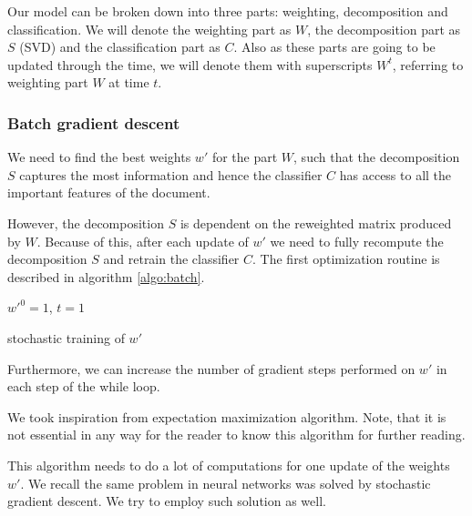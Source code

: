     Our model can be broken down into three parts: weighting, decomposition and classification.
    We will denote the weighting part as $W$, the decomposition part as $S$ (SVD) and the classification part as $C$.
    Also as these parts are going to be updated through the time, we will denote them with superscripts $W^t$, referring to weighting part $W$ at time $t$.
    
    
    \subsubsection{Batch gradient descent}
    
    We need to find the best weights $w'$ for the part $W$, 
    such that the decomposition $S$ captures the most information and hence the classifier $C$ has access to all the important features of the document.
    
    However, the decomposition $S$ is dependent on the reweighted matrix produced by $W$. 
    Because of this, after each update of $w'$ we need to fully recompute the decomposition $S$ and retrain the classifier $C$.
    The first optimization routine is described in algorithm \ref{algo:batch}.
    
    \medskip
    
    \begin{algorithm}[H]
        $w'^0 = 1$, $t=1$\;
        \caption{stochastic training of $w'$} \label{algo:batch}
    \end{algorithm}
    
    Furthermore, we can increase the number of gradient steps performed on $w'$ in each step of the while loop.
    
    We took inspiration from expectation maximization algorithm.  
    Note, that it is not essential in any way for the reader to know this algorithm for further reading.
    
    This algorithm needs to do a lot of computations for one update of the weights $w'$.
    We recall the same problem in neural networks was solved by stochastic gradient descent.
    We try to employ such solution as well.
    
